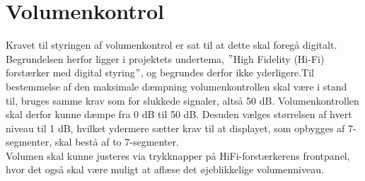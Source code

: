 \section{Volumenkontrol}
\label{valg_volumenkontrol}
Kravet til styringen af volumenkontrol er sat til at dette skal foregå digitalt. Begrundelsen herfor ligger i projektets undertema, $"$High Fidelity (Hi-Fi) forstærker med digital styring$"$, og begrundes derfor ikke yderligere.Til bestemmelse af den maksimale dæmpning volumenkontrollen skal være i stand til, bruges samme krav som for slukkede signaler, altså 50 dB. Volumenkontrollen skal derfor kunne dæmpe fra  0 dB til 50 dB. Desuden vælges størrelsen af hvert niveau til 1 dB, hvilket ydermere sætter krav til at displayet, som opbygges af 7-segmenter, skal bestå af to 7-segmenter.\\
Volumen skal kunne justeres via trykknapper på HiFi-forstærkerens frontpanel, hvor det også skal være muligt at aflæse det øjeblikkelige volumenniveau.  
